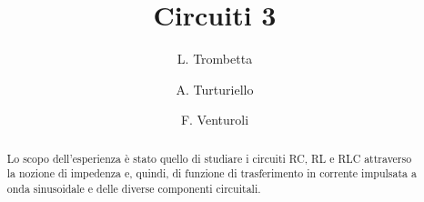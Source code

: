 \begin{frontmatter}
%
\title{Circuiti 3}
%
\author{L. Trombetta} 
\author{A. Turturiello}
\author{F. Venturoli}
%
%
\renewcommand*{\today}{\MonthYearDateFormat\displaydate{dateName}} 
%

\begin{abstract}

Lo scopo dell'esperienza è stato quello di studiare i circuiti RC, RL e RLC attraverso la nozione di impedenza e, quindi, di funzione di trasferimento in corrente impulsata a onda sinusoidale e delle diverse componenti circuitali.

\end{abstract}
%
\end{frontmatter}
%
%
%
 \vspace{1cm}

 \begin{minipage}{\textwidth}
     \tableofcontents
 \end{minipage}
 \clearpage